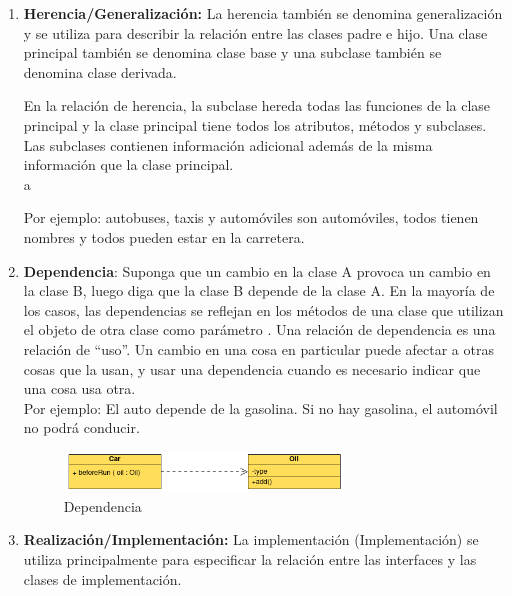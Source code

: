 \documentclass[../main.tex]{subfiles}
\begin{document}
\begin{enumerate}
\begin{enumerate}
                \end{enumerate}
            \item \textbf{Herencia/Generalización:} 
                La herencia también se denomina generalización y se utiliza para describir la relación entre las clases padre e hijo. Una clase principal también se denomina clase base y una subclase también se denomina clase derivada.

                En la relación de herencia, la subclase hereda todas las funciones de la clase principal y la clase principal tiene todos los atributos, métodos y subclases. Las subclases contienen información adicional además de la misma información que la clase principal.\\a

                Por ejemplo: autobuses, taxis y automóviles son automóviles, todos tienen nombres y todos pueden estar en la carretera.

            \item \textbf{Dependencia}: 
                Suponga que un cambio en la clase A provoca un cambio en la clase B, luego diga que la clase B depende de la clase A.
                En la mayoría de los casos, las dependencias se reflejan en los métodos de una clase que utilizan el objeto de otra clase como parámetro .
                Una relación de dependencia es una relación de “uso”. Un cambio en una cosa en particular puede afectar a otras cosas que la usan, y usar una dependencia cuando es necesario indicar que una cosa usa otra. \\
                
                Por ejemplo: El auto depende de la gasolina. Si no hay gasolina, el automóvil no podrá conducir.

                \begin{figure}[ht]
                    \centering
                    \includegraphics[width=0.7\textwidth]{../images/uml_dependencia.png}
                    \caption{Dependencia}
                    \label{fig:uml_dependencia}
                \end{figure}

            \item \textbf{Realización/Implementación:}
                La implementación (Implementación) se utiliza principalmente para especificar la relación entre las interfaces y las clases de implementación.


\end{enumerate}
\end{document}
